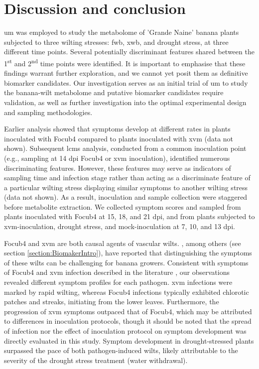 \newpage
\section{Discussion and conclusion}

\Acf{um} was employed to study the metabolome of 'Grande Naine' banana plants subjected to three wilting stresses: \acf{fwb}, \acf{xwb}, and drought stress, at three different time points. Several potentially discriminant features shared between the 1\textsuperscript{st} and 2\textsuperscript{nd} time points were identified. It is important to emphasise that these findings warrant further exploration, and we cannot yet posit them as definitive biomarker candidates. Our investigation serves as an initial trial of \ac{um} to study the banana-wilt metabolome and putative biomarker candidates require validation, as well as further investigation into the optimal experimental design and sampling methodologies.

Earlier analysis showed that symptoms develop at different rates in plants inoculated with \ac{Focub4} compared to plants inoculated with \ac{xvm} (data not shown). Subsequent \ac{lcms} analysis, conducted from a common inoculation point (e.g., sampling at 14 \ac{dpi} \ac{Focub4} or \ac{xvm} inoculation), identified numerous discriminating features. However, these features may serve as indicators of sampling time and infection stage rather than acting as a discriminate feature of a particular wilting stress displaying similar symptoms to another wilting stress (data not shown). As a result, inoculation and sample collection were staggered before metabolite extraction. We collected symptom scores and sampled from plants inoculated with \ac{Focub4} at 15, 18, and 21 \ac{dpi}, and from plants subjected to \ac{xvm}-inoculation, drought stress, and mock-inoculation at 7, 10, and 13 \ac{dpi}.

\ac{Focub4} and \ac{xvm} are both causal agents of vascular wilts. \textcite{Biruma2007}, among others (see section \ref{section:BiomakerIntro}), have reported that distinguishing the symptoms of these wilts can be challenging for banana growers. Consistent with symptoms of \ac{Focub4} and \ac{xvm} infection described in the literature \parencite{Ploetz2015a, Garcia-Bastidas2019, Ordonez2015a, Ocimati2022, Tripathi2021}, our observations revealed different symptom profiles for each pathogen. \ac{xvm} infections were marked by rapid wilting, whereas \ac{Focub4} infections typically exhibited chlorotic patches and streaks, initiating from the lower leaves. Furthermore, the progression of \ac{xvm} symptoms outpaced that of \ac{Focub4}, which may be attributed to differences in inoculation protocols, though it should be noted that the spread of infection nor the effect of inoculation protocol on symptom development was directly evaluated in this study. Symptom development in drought-stressed plants surpassed the pace of both pathogen-induced wilts, likely attributable to the severity of the drought stress treatment (water withdrawal). 


